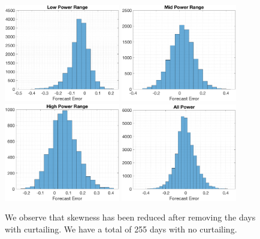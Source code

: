 \documentclass[11pt]{article}
\theoremstyle{definition}
\begin{document}
\begin{figure}[H]
\centering
\includegraphics[width=0.45\textwidth]{plots/LP.eps}
\includegraphics[width=0.45\textwidth]{plots/MP.eps}\\
\includegraphics[width=0.45\textwidth]{plots/HP.eps}
\includegraphics[width=0.45\textwidth]{plots/AP.eps}
\caption{We observe that skewness has been reduced after removing the days with curtailing. We have a total of 255 days with no curtailing.}
  \label{fig:data_after_clean}
\end{figure}
\end{document}
